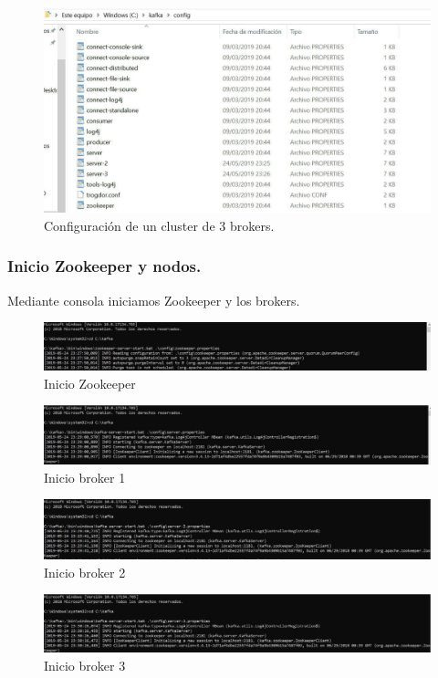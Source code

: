 \documentclass[12pt, a4paper, twoside]{article}
\begin{document}
\begin{figure}[h]
		\centering
		\includegraphics[width=0.8\linewidth]{config_all}
		\caption{Configuración de un cluster de 3 brokers.}
			\end{figure}
\newpage
\subsubsection{Inicio Zookeeper y nodos.}
Mediante consola iniciamos Zookeeper y los brokers.

\begin{figure}[h!]
		\centering
		\includegraphics[width=1.1\linewidth]{zookep}
		\caption{Inicio Zookeeper}
			\end{figure}
			
			\begin{figure}[h!]
		\centering
		\includegraphics[width=1.1\linewidth]{server}
		\caption{Inicio broker 1}
			\end{figure}
			
			\begin{figure}[h!]
		\centering
		\includegraphics[width=1.1\linewidth]{server2}
		\caption{Inicio broker 2}
			\end{figure}
			\begin{figure}[h!]
		\centering
		\includegraphics[width=1.1\linewidth]{server3}
		\caption{Inicio broker 3}
			\end{figure}
		
\end{document}
